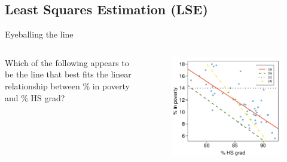 \documentclass{beamer}
\begin{document}
\subsection{Least Squares Estimation (LSE)}
\begin{frame}{Eyeballing the line}
\begin{columns}
\begin{column}{.5\textwidth}
Which of the following appears to be the line that best fits the linear relationship between \% in poverty and \% HS grad?\\~\\

\end{column}
\begin{column}{.5\textwidth}
\begin{figure}
    \centering
    \includegraphics[width=\textwidth]{plots/poverty_hsgrad_manylines.pdf}
\end{figure}
\end{column}
\end{columns}
\end{frame}
\end{document}
